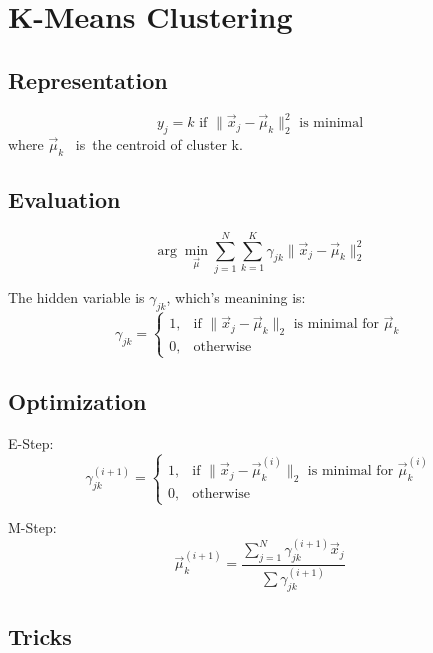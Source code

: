 \chapter{K-Means Clustering}


\section{Representation}
\begin{equation}
y_j=k \text{ if } \|\vec{x}_j-\vec{\mu}_k\|_2^2 \text{ is minimal}
\end{equation}
where $\vec{\mu}_k$ \ is\ the centroid of cluster k.


\section{Evaluation}
\begin{equation}
\arg\min\limits_{\vec{\mu}} \sum_{j=1}^N {\sum_{k=1}^K}\gamma_{jk}{\|\vec{x}_j-\vec{\mu}_k\|_2^2}
\end{equation}

The hidden variable is $\gamma_{jk}$, which's meanining is:
\begin{equation} \nonumber
\gamma_{jk}=\begin{cases}
1, & \text{if } \|\vec{x}_j-\vec{\mu}_k\|_2 \text{ is minimal for } \vec{\mu}_k \\
0, & \text{otherwise}
\end{cases}
\end{equation}


\section{Optimization}
E-Step:
\begin{equation}
\gamma_{jk}^{(i+1)}=\begin{cases} 
1, & \text{if } \|\vec{x}_j-\vec{\mu}_k^{(i)}\|_2 \text{ is minimal for } \vec{\mu}_k^{(i)} \\ 
0, & \text{otherwise}
\end{cases}
\end{equation}

M-Step:
\begin{equation}
\vec{\mu}_{k}^{(i+1)}= \frac{\sum_{j=1}^N{\gamma_{jk}^{(i+1)}\vec{x}_j}}{\sum \gamma_{jk}^{(i+1)}}
\end{equation}


\section{Tricks}

